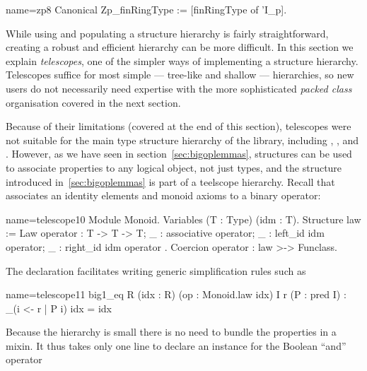 \begin{coq}{name=zp8}{}
Canonical Zp_finRingType := [finRingType of 'I_p].
\end{coq}



While using and populating a structure hierarchy is fairly
straightforward, creating a robust and efficient hierarchy can be more
difficult. In this section we explain \emph{telescopes}, one of the
simpler ways of implementing a structure hierarchy.  Telescopes
suffice for most simple --- tree-like and shallow --- hierarchies, so
new users do not necessarily need expertise with the more
sophisticated \emph{packed class} organisation covered in the next
section.

Because of their limitations (covered at the end of this section),
telescopes were not suitable for the main type structure hierarchy
of the \mcbMC{} library, including , , 
and . However, as we have seen in
section~\ref{sec:bigoplemmas}, structures can be used to associate
properties to any logical object, not just types, and the
 structure introduced in~\ref{sec:bigoplemmas} is part
of a teelscope hierarchy. Recall that  associates an
identity elements and monoid axioms to a binary operator:

\begin{coq}{name=telescope10}{}
Module Monoid.
Variables (T : Type) (idm : T).
Structure law := Law {
  operator : T -> T -> T;
  _ : associative operator;
  _ : left_id idm operator;
  _ : right_id idm operator
}.
Coercion operator : law >-> Funclass.
\end{coq}

The  declaration facilitates writing generic 
simplification rules such as

\begin{coq}{name=telescope11}{}
  big1_eq R (idx : R) (op : Monoid.law idx) I r (P : pred I) :
    \big[op/idx]_(i <- r | P i) idx = idx
\end{coq}

Because the  hierarchy is small there is no need to bundle
the  properties in a mixin. It thus takes only one line
to declare an instance for the Boolean ``and'' operator 

